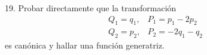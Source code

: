 19. Probar directamente que la transformación
$$
\begin{array}{cl}
Q_1=q_1, & P_1=p_1-2 p_2 \\
Q_2=p_2, & P_2=-2 q_1-q_2
\end{array}
$$
es canónica y hallar una función generatriz.